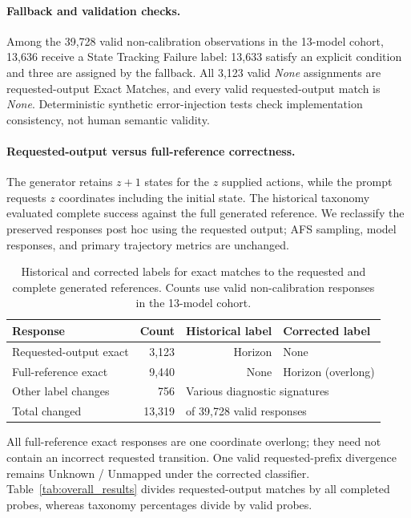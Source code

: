 \documentclass{article}
\begin{document}
\paragraph{Fallback and validation checks.}
Among the 39,728 valid non-calibration observations in the 13-model cohort,
13,636 receive a State Tracking Failure label: 13,633 satisfy an explicit
condition and three are assigned by the fallback. All 3,123 valid
\emph{None} assignments are requested-output Exact Matches, and every valid
requested-output match is \emph{None}. Deterministic synthetic error-injection
tests check implementation consistency, not human semantic validity.

\paragraph{Requested-output versus full-reference correctness.}
The generator retains $z+1$ states for the $z$ supplied actions, while the
prompt requests $z$ coordinates including the initial state. The historical
taxonomy evaluated complete success against the full generated reference.
We reclassify the preserved responses post hoc using the requested output;
AFS sampling, model responses, and primary trajectory metrics are unchanged.

\begin{table}[H]
\centering
\caption{Historical and corrected labels for exact matches to the requested and complete generated references. Counts use valid non-calibration responses in the 13-model cohort.}
\label{tab:reference_convention_reconciliation}
\scriptsize
\begin{tabular}{lrrl}
\toprule
Response & Count & Historical label & Corrected label \\
\midrule
Requested-output exact & 3,123 & Horizon & None \\
Full-reference exact & 9,440 & None & Horizon (overlong) \\
Other label changes & 756 & \multicolumn{2}{l}{Various diagnostic signatures} \\
Total changed & 13,319 & \multicolumn{2}{l}{of 39,728 valid responses} \\
\bottomrule
\end{tabular}
\end{table}

All full-reference exact responses are one coordinate overlong; they need not
contain an incorrect requested transition. One valid requested-prefix
divergence remains Unknown / Unmapped under the corrected classifier.
Table~\ref{tab:overall_results} divides requested-output matches by all
completed probes, whereas taxonomy percentages divide by valid probes.
\end{document}
